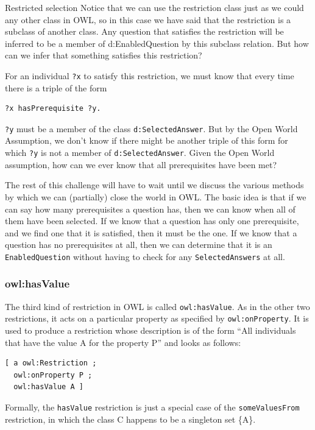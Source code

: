 \begin{challenge}{Restricted selection}
Notice that we can use the restriction class just as we could any other
class in OWL, so in this case we have said that the restriction is a
subclass of another class. Any question that satisfies the restriction
will be inferred to be a member of d:EnabledQuestion by this subclass
relation. But how can we infer that something satisfies this
restriction?

For an individual \texttt{?x} to satisfy this restriction, we must know that
every time there is a triple of the form

\begin{lstlisting}
?x hasPrerequisite ?y.
\end{lstlisting}

\texttt{?y} must be a member of the class \texttt{d:SelectedAnswer}. But by the Open World
Assumption, we don't know if there might be another triple of this form
for which \texttt{?y} is not a member of \texttt{d:SelectedAnswer}. Given the Open World
assumption, how can we ever know that all prerequisites have been met?
\end{challenge}

The rest of this challenge will have to wait until we discuss the
various methods by which we can (partially) close the world in OWL. The
basic idea is that if we can say how many prerequisites a question has,
then we can know when all of them have been selected. If we know that a
question has only one prerequisite, and we find one that it is
satisfied, then it must be the one. If we know that a question has no
prerequisites at all, then we can determine that it is an
\texttt{EnabledQuestion} without having to check for any \texttt{SelectedAnswers} at all.

\subsubsection{owl:hasValue}

The third kind of restriction in OWL is called \texttt{owl:hasValue}. As in the
other two restrictions, it acts on a particular property as specified by
\texttt{owl:onProperty}. It is used to produce a restriction whose description is
of the form ``All individuals that have the value A for the property P''
and looks as follows:

\begin{lstlisting}
[ a owl:Restriction ;
  owl:onProperty P ;
  owl:hasValue A ]
\end{lstlisting}

Formally, the \texttt{hasValue} restriction is just a special case of the
\texttt{someValuesFrom} restriction, in which the class C happens to be a
singleton set \{A\}.

